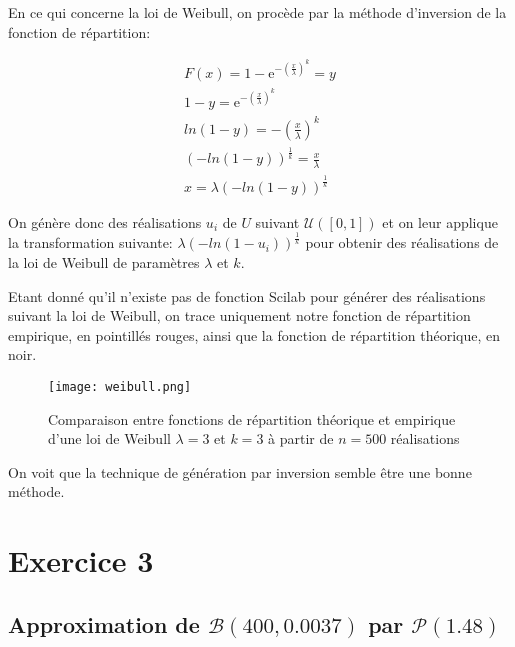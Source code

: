 \documentclass{article}
\begin{document}
\begin{multicols}{2}
En ce qui concerne la loi de Weibull, on procède par la méthode d'inversion de
la fonction de répartition:

\begin{equation}
    \begin{multlined}
        F(x) = 1 - \mathrm{e}^{-\left({\frac{x}{\lambda}}\right)^k} = y \\
        1 - y = \mathrm{e}^{-\left({\frac{x}{\lambda}}\right)^k} \\
        ln(1 - y) = -\left(\frac{x}{\lambda}\right)^k \\
        (-ln(1 - y))^{\frac{1}{k}} = \frac{x}{\lambda} \\
        x = \lambda (-ln(1 - y))^{\frac{1}{k}}
    \end{multlined}
\end{equation}

On génère donc des réalisations $u_i$ de $U$ suivant $\mathcal{U}([0, 1])$ et on
leur applique la transformation suivante: $\lambda (-ln(1 - u_i))^{\frac{1}{k}}$
pour obtenir des réalisations de la loi de Weibull de paramètres $\lambda$ et
$k$.

Etant donné qu'il n'existe pas de fonction Scilab pour générer des réalisations
suivant la loi de Weibull, on trace uniquement notre fonction de répartition
empirique, en pointillés rouges, ainsi que la fonction de répartition théorique,
en noir.

\begin{figure}[H]
    \begin{center}
        \texttt{[image: weibull.png]}
        \centering
        \captionsetup{justification=centering}
        \caption{\label{fig:gaussienne}Comparaison entre fonctions de répartition théorique et empirique d'une loi de Weibull $\lambda = 3$ et $k = 3$ à partir de $n = 500$ réalisations}
    \end{center}
\end{figure}

On voit que la technique de génération par inversion semble être une bonne
méthode.


\section{Exercice 3}\label{sec:ex3}

\subsection{Approximation de $\mathcal{B}(400, 0.0037)$ par $\mathcal{P}(1.48)$}\label{subsec:ex31}


\end{multicols}
\end{document}

